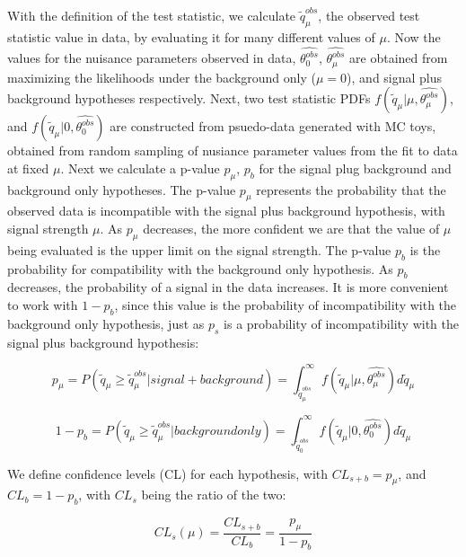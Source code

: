 With the definition of the test statistic, we calculate $\tilde{q}_{\mu}^{obs}$, the observed test statistic value in data, by evaluating it for many different
values of $\mu$. Now the values for the nuisance parameters observed in data, $\hat{\theta_{0}^{obs}}$, $\hat{\theta_{\mu}^{obs}}$ are obtained from maximizing
the likelihoods under the background only ($\mu=0$), and signal plus background hypotheses respectively. Next, two test statistic PDFs
$f(\tilde{q}_{\mu}|\mu,\hat{\theta_{\mu}^{obs}})$, and $f(\tilde{q}_{\mu}|0,\hat{\theta_{0}^{obs}})$ are constructed from psuedo-data
generated with MC toys, obtained from random sampling of nusiance parameter values from the fit to data at fixed $\mu$.  Next we calculate a p-value $p_{\mu}$, $p_{b}$
for the signal plug background and background only hypotheses. The p-value $p_{\mu}$ represents the probability that the observed data is incompatible with the
signal plus background hypothesis, with signal strength $\mu$. As $p_{\mu}$ decreases, the more confident we are that the value of $\mu$ being evaluated is the
upper limit on the signal strength. The p-value $p_{b}$ is the probability for compatibility with the background only hypothesis. As $p_{b}$ decreases, the probability
of a signal in the data increases. It is more convenient to work with $1-p_{b}$, since this value is the probability of incompatibility with the background only hypothesis,
just as $p_{s}$ is a probability of incompatibility with the signal plus background hypothesis:

\begin{equation}
\label{eqn:pvalues1}
p_{\mu} = P(\tilde{q}_{\mu} \geq \tilde{q}_{\mu}^{obs}|signal+background) = \int_{\tilde{q}_{\mu}^{obs}}^{\infty} f(\tilde{q}_{\mu}|\mu,\hat{\theta_{\mu}^{obs}}) d\tilde{q}_{\mu}
\end{equation}

\begin{equation}
\label{eqn:pvalues2}
1- p_{b} = P(\tilde{q}_{\mu} \geq \tilde{q}_{\mu}^{obs}|background only) = \int_{\tilde{q}_{0}^{obs}}^{\infty} f(\tilde{q}_{\mu}|0,\hat{\theta_{0}^{obs}}) d\tilde{q}_{\mu}
\end{equation}

\noindent We define confidence levels (CL) for each hypothesis, with $CL_{s+b} = p_{\mu}$, and $CL_{b} = 1-p_{b}$, with $CL_{s}$ being the ratio of the two:

\begin{equation}
\label{eqn:cls}
CL_{s}(\mu) = \frac{CL_{s+b}}{CL_{b}} = \frac{p_{\mu}}{1-p_{b}}
\end{equation}

